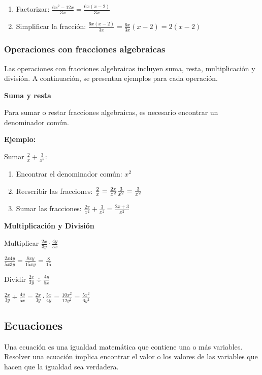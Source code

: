 \begin{enumerate}
    \item Factorizar: $\frac{6x^2-12x}{3x} = \frac{6x(x-2)}{3x}$
    \item Simplificar la fracción: $\frac{6x(x-2)}{3x} = \frac{6x}{3x}(x-2) = 2(x-2)$
\end{enumerate}

\subsubsection{Operaciones con fracciones algebraicas}

Las operaciones con fracciones algebraicas incluyen suma, resta, multiplicación y división. A continuación, se presentan ejemplos para cada operación.

\textbf{Suma y resta}

Para sumar o restar fracciones algebraicas, es necesario encontrar un denominador común.

\textbf{Ejemplo:}

Sumar $\frac{2}{x} + \frac{3}{x^2}$:

\begin{enumerate}
    \item Encontrar el denominador común: $x^2$
    \item Reescribir las fracciones:
          $\\
              \frac{2}{x} = \frac{2x}{x^2}\\
              \frac{3}{x^2} = \frac{3}{x^2}
          $
    \item Sumar las fracciones: $\frac{2x}{x^2} + \frac{3}{x^2} = \frac{2x+3}{x^2}$
\end{enumerate}

\textbf{Multiplicación y División}

Multiplicar $\frac{2x}{3y} \cdot \frac{4y}{5x}$

$\frac{2x4y}{5x3y} = \frac{8xy}{15xy} = \frac{8}{15}$

Dividir $\frac{2x}{3y} \div \frac{4y}{5x}$

$\frac{2x}{3y} \div \frac{4y}{5x} = \frac{2x}{3y} \cdot \frac{5x}{4y} = \frac{10x^2}{12y^2} = \frac{5x^2}{6y^2}$

\subsection{Ecuaciones}

Una ecuación es una igualdad matemática que contiene una o más variables. Resolver una ecuación implica encontrar el valor o los valores de las variables que hacen que la igualdad sea verdadera.

